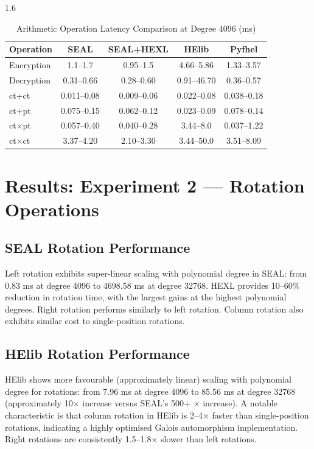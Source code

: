 \begin{spacing}{1.6}
\begin{table}[H]
\centering
\caption{Arithmetic Operation Latency Comparison at Degree 4096 (ms)}
\label{tab:arith}
\begin{tabular}{lcccc}
\toprule
\textbf{Operation} & \textbf{SEAL} & \textbf{SEAL+HEXL} & \textbf{HElib} & \textbf{Pyfhel} \\
\midrule
Encryption & 1.1--1.7 & 0.95--1.5 & 4.66--5.86 & 1.33--3.57 \\
Decryption & 0.31--0.66 & 0.28--0.60 & 0.91--46.70 & 0.36--0.57 \\
ct+ct & 0.011--0.08 & 0.009--0.06 & 0.022--0.08 & 0.038--0.18 \\
ct+pt & 0.075--0.15 & 0.062--0.12 & 0.023--0.09 & 0.078--0.14 \\
ct$\times$pt & 0.057--0.40 & 0.040--0.28 & 3.44--8.0 & 0.037--1.22 \\
ct$\times$ct & 3.37--4.20 & 2.10--3.30 & 3.44--50.0 & 3.51--8.09 \\
\bottomrule
\end{tabular}
\end{table}

\section{Results: Experiment 2 --- Rotation Operations}

\subsection{SEAL Rotation Performance}

Left rotation exhibits super-linear scaling with polynomial degree in SEAL:
from 0.83 ms at degree 4096 to 4698.58 ms at degree 32768. HEXL provides
10--60\% reduction in rotation time, with the largest gains at the highest
polynomial degrees. Right rotation performs similarly to left rotation.
Column rotation also exhibits similar cost to single-position rotations.

\subsection{HElib Rotation Performance}

HElib shows more favourable (approximately linear) scaling with polynomial
degree for rotations: from 7.96 ms at degree 4096 to 85.56 ms at degree 32768
(approximately 10$\times$ increase versus SEAL's 500$+$ $\times$ increase).
A notable characteristic is that column rotation in HElib is 2--4$\times$
faster than single-position rotations, indicating a highly optimised Galois
automorphism implementation. Right rotations are consistently 1.5--1.8$\times$
slower than left rotations.


\end{spacing}
